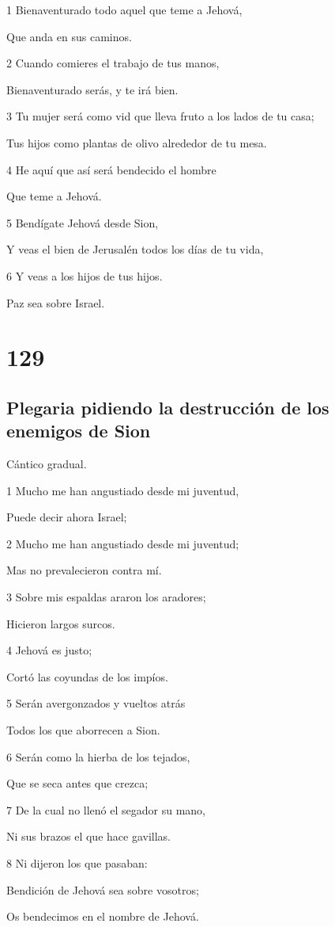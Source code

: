 \par 1 Bienaventurado todo aquel que teme a Jehová,
\par Que anda en sus caminos.
\par 2 Cuando comieres el trabajo de tus manos,
\par Bienaventurado serás, y te irá bien.
\par 3 Tu mujer será como vid que lleva fruto a los lados de tu casa;
\par Tus hijos como plantas de olivo alrededor de tu mesa.
\par 4 He aquí que así será bendecido el hombre
\par Que teme a Jehová.
\par 5 Bendígate Jehová desde Sion,
\par Y veas el bien de Jerusalén todos los días de tu vida,
\par 6 Y veas a los hijos de tus hijos.
\par Paz sea sobre Israel.

\chapter{129}

\section*{Plegaria pidiendo la destrucción de los enemigos de Sion}

\par Cántico gradual.

\par 1 Mucho me han angustiado desde mi juventud,
\par Puede decir ahora Israel;
\par 2 Mucho me han angustiado desde mi juventud;
\par Mas no prevalecieron contra mí.
\par 3 Sobre mis espaldas araron los aradores;
\par Hicieron largos surcos.
\par 4 Jehová es justo;
\par Cortó las coyundas de los impíos.
\par 5 Serán avergonzados y vueltos atrás
\par Todos los que aborrecen a Sion.
\par 6 Serán como la hierba de los tejados,
\par Que se seca antes que crezca;
\par 7 De la cual no llenó el segador su mano,
\par Ni sus brazos el que hace gavillas.
\par 8 Ni dijeron los que pasaban:
\par Bendición de Jehová sea sobre vosotros;
\par Os bendecimos en el nombre de Jehová.


